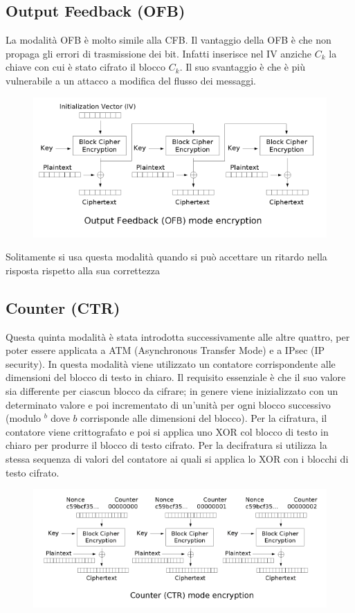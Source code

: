 \documentclass[10pt,a4paper]{article}
\begin{document}
\subsection{Output Feedback (OFB)}
La modalità OFB è molto simile alla CFB. Il vantaggio della OFB è che non propaga gli errori di trasmissione dei bit. Infatti inserisce nel IV anziche $C_k$ la chiave con cui è stato cifrato il blocco $C_k$. Il suo svantaggio è che è più vulnerabile a un attacco a modifica del flusso dei messaggi.

\begin{figure}[htbp]
\includegraphics[scale=0.8]{immagini/ofb.png}
\end{figure}

Solitamente si usa questa modalità quando si può accettare un ritardo nella risposta rispetto alla sua correttezza

\subsection{Counter (CTR)}
Questa quinta modalità è stata introdotta successivamente alle altre quattro, per poter essere applicata a ATM (Asynchronous Transfer Mode) e a IPsec (IP security).
In questa modalità viene utilizzato un contatore corrispondente alle dimensioni del blocco di testo in chiaro. Il requisito essenziale è che il suo valore sia differente per ciascun blocco da cifrare; in genere viene inizializzato con un determinato valore e poi incrementato di un'unità per ogni blocco successivo (modulo $^b$ dove $b$ corrisponde alle dimensioni del blocco).
Per la cifratura, il contatore viene crittografato e poi si applica uno XOR col blocco di testo in chiaro per produrre il blocco di testo cifrato.
Per la decifratura si utilizza la stessa sequenza di valori del contatore ai quali si applica lo XOR con i blocchi di testo cifrato.

\begin{figure}[htbp]
\includegraphics[scale=0.8]{immagini/ctr.png}
\end{figure}
\end{document}
